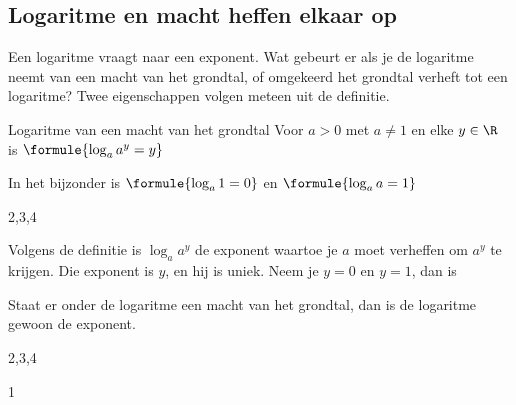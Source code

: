\begin{oefeningen}
\end{oefeningen}

\subsection{Logaritme en macht heffen elkaar op}

Een logaritme vraagt naar een exponent. Wat gebeurt er als je de logaritme neemt van een macht van het grondtal, of omgekeerd het grondtal verheft tot een logaritme? Twee eigenschappen volgen meteen uit de definitie.

\begin{theorie}
\begin{stelling}{Logaritme van een macht van het grondtal}
Voor $a > 0$ met $a \neq 1$ en elke $y \in \R$ is \qquad $\formule{\log_a a^y = y}$

In het bijzonder is \qquad $\formule{\log_a 1 = 0}$ \qquad en \qquad $\formule{\log_a a = 1}$
\end{stelling}
\begin{alleenvoor}{2,3,4}
\begin{bewijs}
Volgens de definitie is $\log_a a^y$ de exponent waartoe je $a$ moet verheffen om $a^y$ te krijgen. Die exponent is $y$, en hij is uniek. Neem je $y = 0$ en $y = 1$, dan is
\end{bewijs}
\end{alleenvoor}
\end{theorie}

Staat er onder de logaritme een macht van het grondtal, dan is de logaritme gewoon de exponent.

\begin{alleenvoor}{2,3,4}
\end{alleenvoor}
\begin{alleenvoor}{1}
\end{alleenvoor}

